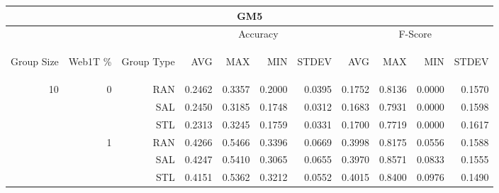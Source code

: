 \begin{center}
\begin{table}[htbp] 
 \begin{center}
\begin{tabular}{ | r | r | r | r | r | r | r | r | r | r | r |}
\hline
\multicolumn{11}{|c|}{GM5}\\
\hline
 & & & \multicolumn{4}{|c|}{Accuracy} & \multicolumn{4}{|c|}{F-Score}\\ \cline{4-11}
\begin{sideways}Group Size\end{sideways} & \begin{sideways}Web1T \%\end{sideways} & \begin{sideways}Group Type\end{sideways} & \begin{sideways}AVG\end{sideways} & \begin{sideways}MAX\end{sideways} & \begin{sideways}MIN\end{sideways} & \begin{sideways}STDEV\end{sideways} & \begin{sideways}AVG\end{sideways} & \begin{sideways}MAX\end{sideways} & \begin{sideways}MIN\end{sideways} & \begin{sideways}STDEV\end{sideways}\\
\hline
\multirow{18}{*}{10}
 & \multirow{3}{*}{0} & RAN & 0.2462 & 0.3357 & 0.2000 & 0.0395 & 0.1752 & 0.8136 & 0.0000 & 0.1570\\ \cline{3-11}
 &   & SAL & 0.2450 & 0.3185 & 0.1748 & 0.0312 & 0.1683 & 0.7931 & 0.0000 & 0.1598\\ \cline{3-11}
 &   & STL & 0.2313 & 0.3245 & 0.1759 & 0.0331 & 0.1700 & 0.7719 & 0.0000 & 0.1617\\ \cline{2-11}
 & \multirow{3}{*}{1} & RAN & 0.4266 & 0.5466 & 0.3396 & 0.0669 & 0.3998 & 0.8175 & 0.0556 & 0.1588\\ \cline{3-11}
 &   & SAL & 0.4247 & 0.5410 & 0.3065 & 0.0655 & 0.3970 & 0.8571 & 0.0833 & 0.1555\\ \cline{3-11}
 &   & STL & 0.4151 & 0.5362 & 0.3212 & 0.0552 & 0.4015 & 0.8400 & 0.0976 & 0.1490\\ \cline{2-11}

\end{tabular}
\end{center}
\end{table}
\end{center}
